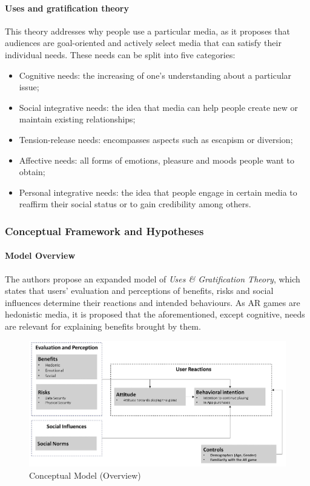 \documentclass[runningheads]{llncs}
\begin{document}
\paragraph{Uses and gratification theory} This theory addresses why people use a particular media, as it proposes that audiences are goal-oriented and actively select media that can satisfy their individual needs. These needs can be split into five categories:
\begin{itemize}
    \item Cognitive needs: the increasing of one's understanding about a particular issue;
    \item Social integrative needs: the idea that media can help people create new or maintain existing relationships;
    \item Tension-release needs: encompasses aspects such as escapism or diversion;
    \item Affective needs: all forms of emotions, pleasure and moods people want to obtain;
    \item Personal integrative needs: the idea that people engage in certain media to reaffirm their social status or to gain credibility among others. 
\end{itemize}

\subsubsection{Conceptual Framework and Hypotheses}
\paragraph{Model Overview} The authors propose an expanded model of \textit{Uses \& Gratification Theory}, which states that users' evaluation and perceptions of benefits, risks and social influences determine their reactions and intended behaviours. As AR games are hedonistic media, it is proposed that the aforementioned, except cognitive, needs are relevant for explaining benefits brought by them.

\begin{figure}
    \centering
    \includegraphics[width=\textwidth]{Screenshot_23.png}
    \caption{Conceptual Model (Overview)}
    \label{fig:model}
\end{figure}
\end{document}
